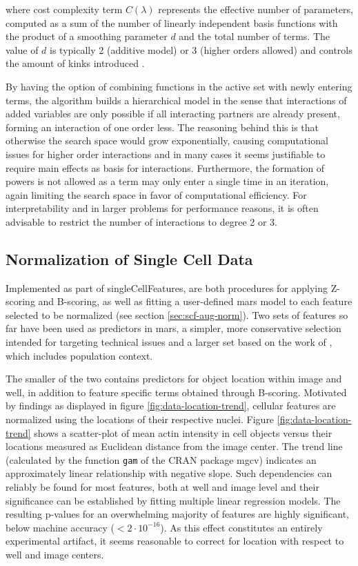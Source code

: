 where cost complexity term $C(\lambda)$ represents the effective number of parameters, computed as a sum of the number of linearly independent basis functions with the product of a smoothing parameter $d$ and the total number of terms. The value of $d$ is typically 2 (additive model) or 3 (higher orders allowed) and controls the amount of kinks introduced \citep{Friedman1991}.

By having the option of combining functions in the active set with newly entering terms, the algorithm builds a hierarchical model in the sense that interactions of added variables are only possible if all interacting partners are already present, forming an interaction of one order less. The reasoning behind this is that otherwise the search space would grow exponentially, causing computational issues for higher order interactions and in many cases it seems justifiable to require main effects as basis for interactions. Furthermore, the formation of powers is not allowed as a term may only enter a single time in an iteration, again limiting the search space in favor of computational efficiency. For interpretability and in larger problems for performance reasons, it is often advisable to restrict the number of interactions to degree 2 or 3.

\subsection{Normalization of Single Cell Data}
Implemented as part of singleCellFeatures, are both procedures for applying Z-scoring and B-scoring, as well as fitting a user-defined \gls{mars} model to each feature selected to be normalized (see section \ref{sec:scf-aug-norm}). Two sets of features so far have been used as predictors in \gls{mars}, a simpler, more conservative selection intended for targeting technical issues and a larger set based on the work of \cite{Knapp2011}, which includes population context.



The smaller of the two contains predictors for object location within image and well, in addition to feature specific terms obtained through B-scoring. Motivated by findings as displayed in figure \ref{fig:data-location-trend}, cellular features are normalized using the locations of their respective nuclei. Figure \ref{fig:data-location-trend} shows a scatter-plot of mean actin intensity in cell objects versus their locations measured as Euclidean distance from the image center. The trend line (calculated by the function \texttt{gam} of the CRAN package mgcv) indicates an approximately linear relationship with negative slope. Such dependencies can reliably be found for most features, both at well and image level and their significance can be established by fitting multiple linear regression models. The resulting p-values for an overwhelming majority of features are highly significant, below machine accuracy ($<2\cdot10^{-16}$). As this effect constitutes an entirely experimental artifact, it seems reasonable to correct for location with respect to well and image centers.

